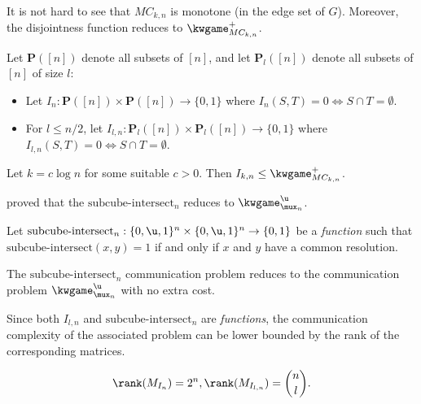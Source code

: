 \documentclass[acmsmall, nonacm, authorversion]{acmart}
\begin{document}
It is not hard to see that $MC_{k,n}$ is monotone (in the edge set of $G$). Moreover, the disjointness  function reduces to $\kwgame_{MC_{k,n}}^+$.
\begin{definition}\label{def:disjointness-function}
Let $\mathbf{P}([n])$ denote all subsets of $[n]$, and let $\mathbf{P}_l([n])$ denote all subsets of $[n]$ of size $l$:

\begin{itemize}
    \item Let $I_n:\mathbf{P}([n]) \times \mathbf{P}([n]) \rightarrow \{0,1\}$ where $I_n(S, T) = 0 \iff S \cap T = \emptyset$.
    \item For $l \le n/2$, let $I_{l,n}: \mathbf{P}_l([n]) \times \mathbf{P}_l([n]) \rightarrow \{0,1\}$ where $I_{l,n}(S, T) = 0 \iff S \cap T = \emptyset$.
\end{itemize}
\end{definition}

\begin{theorem}\label{thm:disjointness-to-set-covering}
Let $k=c\log n$ for some suitable $c > 0$. Then $I_{k,n}\le \kwgame^+_{MC_{k,n}}$. 
\end{theorem}

\cite{IK23} proved that the $\text{subcube-intersect}_n$ reduces to $\kwgame_{\mux_n}^\u$.

\begin{definition}
\sloppy Let $\text{subcube-intersect}_n:\{0,\u,1\}^n \times \{0,\u,1\}^n\rightarrow \{0,1\}$ be a \emph{function} such that $\text{subcube-intersect}(x,y)=1$ if and only if $x$ and $y$ have a common resolution.
\end{definition}

\begin{lemma}[{\cite[Lemma 5.10]{IK23}}]\label{lem:reduction-sub-inter-mux}
The $\text{subcube-intersect}_n$ communication problem reduces to the communication problem $\kwgame_{\mux_n}^\u$ with no extra cost.
\end{lemma}

Since both $I_{l,n}$ and $\text{subcube-intersect}_n$ are \emph{functions}, the communication complexity of the associated problem can be lower bounded by the rank of the corresponding matrices.
\begin{theorem}\label{thm:rank-of-disjointness}
\[
\rank(M_{I_n})=2^n,\rank(M_{I_{l,n}})=\binom{n}{l}.
\]
\end{theorem}
\end{document}

